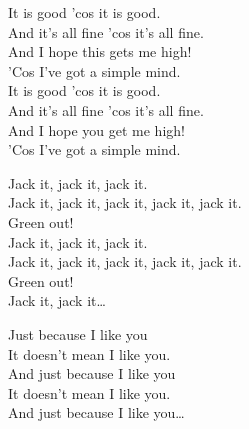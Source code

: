 
It is good 'cos it is good. \\
And it's all fine 'cos it's all fine. \\
And I hope this gets me high! \\
'Cos I've got a simple mind. \\

It is good 'cos it is good. \\
And it's all fine 'cos it's all fine. \\
And I hope you get me high! \\
'Cos I've got a simple mind. \\




Jack it, jack it, jack it. \\
Jack it, jack it, jack it, jack it, jack it. \\

Green out! \\

Jack it, jack it, jack it. \\
Jack it, jack it, jack it, jack it, jack it. \\

Green out! \\

Jack it, jack it… \\




Just because I like you \\
It doesn't mean I like you. \\

And just because I like you \\
It doesn't mean I like you. \\

And just because I like you… \\
